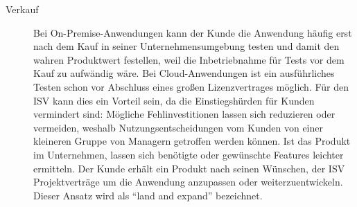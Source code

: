 \begin{description}

	\item[Verkauf] Bei On-Premise-Anwendungen kann der Kunde die Anwendung
häufig erst nach dem Kauf in seiner Unternehmensumgebung testen und damit den
wahren Produktwert festellen, weil die Inbetriebnahme für Tests vor dem Kauf zu
aufwändig wäre. Bei Cloud-Anwendungen ist ein ausführliches Testen schon vor
Abschluss eines großen Lizenzvertrages möglich. Für den ISV kann dies ein
Vorteil sein, da die Einstiegshürden für Kunden vermindert sind: Mögliche
Fehlinvestitionen lassen sich reduzieren oder vermeiden, weshalb
Nutzungsentscheidungen vom Kunden von einer kleineren Gruppe von Managern
getroffen werden können. Ist das Produkt im Unternehmen, lassen sich benötigte
oder gewünschte Features leichter ermitteln. Der Kunde erhält ein Produkt nach
seinen Wünschen, der ISV Projektverträge um die Anwendung anzupassen oder
weiterzuentwickeln. Dieser Ansatz wird als "`land and expand"' bezeichnet.
\end{description}

